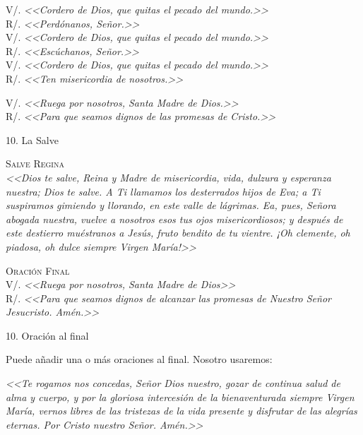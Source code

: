 \documentclass[12pt, letterpaper]{report}
\begin{document}
    \noindent
    \Large V/. \textit{<<Cordero de Dios, que quitas el pecado del mundo.>>}\\ R/. \textit{<<Perdónanos, Señor.>>}\\
    \Large V/. \textit{<<Cordero de Dios, que quitas el pecado del mundo.>>}\\
    R/. \textit{<<Escúchanos, Señor.>>}\\
    \Large V/. \textit{<<Cordero de Dios, que quitas el pecado del mundo.>>}\\
    R/. \textit{<<Ten misericordia de nosotros.>>}
    
    \noindent
    \Large V/. \textit{<<Ruega por nosotros, Santa Madre de Dios.>>}\\
    R/. \textit{<<Para que seamos dignos de las promesas de Cristo.>>}
    
    
    
    \LARGE 10. La Salve
    
    \Large \textsc{Salve Regina}\\
    \textit{<<Dios te salve, Reina y Madre de misericordia, vida, dulzura y esperanza nuestra; Dios te salve. A Ti llamamos los desterrados hijos de Eva; a Ti suspiramos gimiendo y llorando, en este valle de lágrimas. Ea, pues, Señora abogada nuestra, vuelve a nosotros esos tus ojos misericordiosos; y después de este destierro muéstranos a Jesús, fruto bendito de tu vientre. ¡Oh clemente, oh piadosa, oh dulce siempre Virgen María!>>}

    \Large \textsc{Oración Final}\\
    V/. \textit{<<Ruega por nosotros, Santa Madre de Dios>>}\\
    R/. \textit{<<Para que seamos dignos de alcanzar las promesas de Nuestro Señor Jesucristo. Amén.>>}
    
    
    \LARGE 10. Oración al final
    
    \Large Puede añadir una o más oraciones al final. Nosotro usaremos:
    
    \textit{<<Te rogamos nos concedas, Señor Dios nuestro, gozar de continua salud de alma y cuerpo, y por la gloriosa intercesión de la bienaventurada siempre Virgen María, vernos libres de las tristezas de la vida presente y disfrutar de las alegrías eternas. Por Cristo nuestro Señor. Amén.>>}
    
\end{document}

